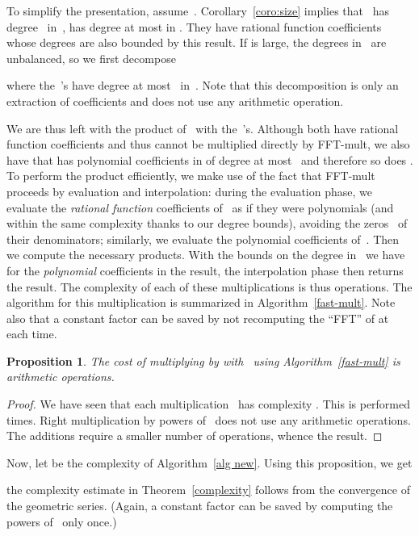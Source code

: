 \documentclass{amsart}
\newtheorem{prop}{Proposition}
\theoremstyle{definition}
\begin{document}
To simplify the presentation, assume~. Corollary~\ref{coro:size} implies that~ has degree~ in~,  has degree at most  in . They have rational function coefficients whose degrees are also bounded by this result. If  is large, the degrees in~ are unbalanced, so we first decompose

where the~'s have degree at most~ in~. Note that this decomposition is only an extraction of coefficients and does not use any arithmetic operation.

We are thus left with the product of~ with the~'s. Although both have rational function coefficients and thus cannot be multiplied directly by FFT-mult, we also have that  has polynomial coefficients in  of degree at most~ and therefore so does . To perform the product efficiently, we make use of the fact that FFT-mult proceeds by evaluation and interpolation: during the evaluation phase, we evaluate the \emph{rational function} coefficients of~ as if they were polynomials (and within the same complexity thanks to our degree bounds), avoiding the zeros~ of their denominators; similarly, we evaluate the polynomial coefficients of~. Then we compute the necessary products. With the bounds on the degree in~ we have for the \emph{polynomial} coefficients in the result, the interpolation phase then returns the result. The complexity of each of these multiplications is thus  operations. The algorithm for this multiplication is summarized in Algorithm~\ref{fast-mult}. Note also that a constant factor can be saved by not recomputing the ``FFT'' of  at each time.

\begin{prop}
The cost of multiplying  by  with~ using Algorithm~\ref{fast-mult} is  arithmetic operations.
\end{prop}

\begin{proof}
We have seen that each multiplication~ has complexity . This is performed  times. Right multiplication by powers of~ does not use any arithmetic operations. The additions require a smaller number of operations, whence the result.
\end{proof}

Now, let  be the complexity of Algorithm~\ref{alg new}. Using this proposition, we get
 
the complexity estimate in Theorem~\ref{complexity} follows from the convergence of the geometric series. (Again, a constant factor can be saved by computing the powers of~ only once.)
\end{document}
